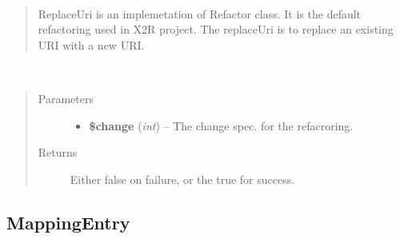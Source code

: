 \documentclass[letterpaper,10pt,english]{sphinxmanual}
\begin{document}
\begin{fulllineitems}
\label{docs/api:ReplaceUri}~\begin{quote}

ReplaceUri is an implemetation of
Refactor class. It is the default
refactoring used in X2R project.
The replaceUri is to replace an existing URI
with a new URI.
\end{quote}

\begin{fulllineitems}
\label{docs/api:ReplaceUri::refactoring}~\begin{quote}\begin{description}
\item[{Parameters}] \leavevmode\begin{itemize}
\item {} 
\textbf{\$change} (\emph{int}) -- The change spec. for the refacroring.

\end{itemize}

\item[{Returns}] \leavevmode
Either false on failure, or the true for success.

\end{description}\end{quote}

\end{fulllineitems}


\end{fulllineitems}



\subsection{MappingEntry}
\label{docs/api:mappingentry}
\end{document}

